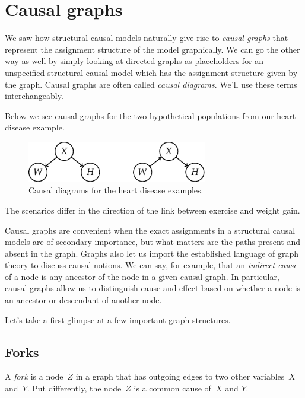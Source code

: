 \documentclass{tufte-book}
\begin{document}
\hypertarget{causal-graphs}{%
\section{Causal graphs}\label{causal-graphs}}

We saw how structural causal models naturally give rise to \emph{causal
graphs} that represent the assignment structure of
the model graphically. We can go the other way as well by simply looking
at directed graphs as placeholders for an unspecified structural causal
model which has the assignment structure given by the graph. Causal
graphs are often called \emph{causal diagrams}. We'll use these terms
interchangeably.

Below we see causal graphs for the two hypothetical populations from our
heart disease example.

\begin{figure}
\centering
\includegraphics[width=0.7\textwidth,height=\textheight]{assets/causal-ex}
\caption{Causal diagrams for the heart disease examples.}
\end{figure}

The scenarios differ in the direction of the link between exercise and
weight gain.

Causal graphs are convenient when the exact assignments in a structural
causal models are of secondary importance, but what matters are the
paths present and absent in the graph. Graphs also let us import the
established language of graph theory to discuss causal notions. We can
say, for example, that an \emph{indirect cause} of
a node is any ancestor of the node in a given causal graph. In
particular, causal graphs allow us to distinguish cause and effect based
on whether a node is an ancestor or descendant of another node.

Let's take a first glimpse at a few important graph structures.

\hypertarget{forks}{%
\subsection{Forks}\label{forks}}

A \emph{fork} is a node~\(Z\) in a graph that has outgoing edges to two
other variables~\(X\) and~\(Y\). Put differently, the node~\(Z\) is a
common cause of~\(X\) and
\(Y\).
\end{document}
